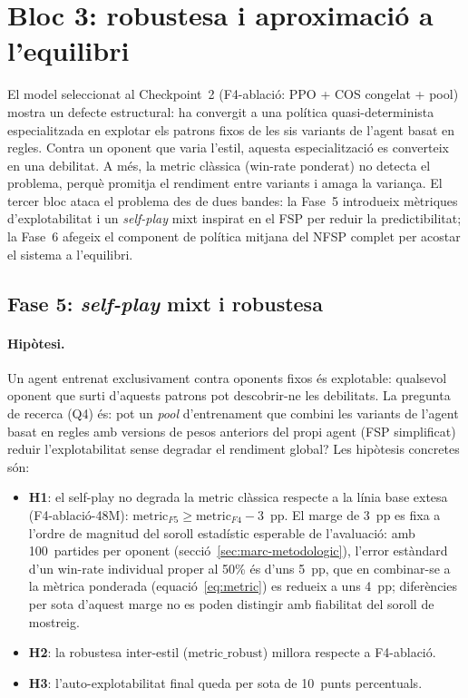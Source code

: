 ﻿%

\section{Bloc 3: robustesa i aproximació a l'equilibri}
\label{sec:bloc3}

El model seleccionat al Checkpoint~2 (F4-ablació: PPO + COS congelat + pool) mostra un
defecte estructural: ha convergit a una política quasi-determinista especialitzada en
explotar els patrons fixos de les sis variants de l'agent basat en regles. Contra un oponent
que varia l'estil, aquesta especialització es converteix en una debilitat. A més, la
\(\text{metric}\) clàssica (win-rate ponderat) no detecta el problema, perquè promitja el
rendiment entre variants i amaga la variança. El tercer bloc ataca el problema des de dues
bandes: la Fase~5 introdueix mètriques d'explotabilitat i un \emph{self-play} mixt
inspirat en el \acf{FSP} per reduir la predictibilitat; la Fase~6 afegeix el
component de política mitjana del \ac{NFSP} complet per acostar el sistema a l'equilibri.

\subsection{Fase 5: \emph{self-play} mixt i robustesa}
\label{sec:fase5}

\paragraph{Hipòtesi.} Un agent entrenat exclusivament contra oponents fixos és explotable:
qualsevol oponent que surti d'aquests patrons pot descobrir-ne les debilitats. La
pregunta de recerca (Q4) és: pot un \emph{pool} d'entrenament que combini les variants
de l'agent basat en regles amb versions de pesos anteriors del propi agent (\ac{FSP}
simplificat) reduir l'explotabilitat sense degradar el rendiment global? Les hipòtesis
concretes són:
\begin{itemize}
  \item \textbf{H1}: el self-play no degrada la \(\text{metric}\) clàssica respecte a la
        línia base extesa (F4-ablació-48M): \(\text{metric}_{F5} \geq \text{metric}_{F4} - 3\)~pp.
        El marge de 3~pp es fixa a l'ordre de magnitud del soroll estadístic esperable de
        l'avaluació: amb 100~partides per oponent (secció~\ref{sec:marc-metodologic}),
        l'error estàndard d'un win-rate individual proper al 50\% és d'uns 5~pp, que en
        combinar-se a la mètrica ponderada (equació~\ref{eq:metric}) es redueix a uns
        4~pp; diferències per sota d'aquest marge no es poden distingir amb fiabilitat del
        soroll de mostreig.
  \item \textbf{H2}: la robustesa inter-estil (\(\text{metric\_robust}\)) millora
        respecte a F4-ablació.
  \item \textbf{H3}: l'auto-explotabilitat final queda per sota de 10~punts percentuals.
\end{itemize}


